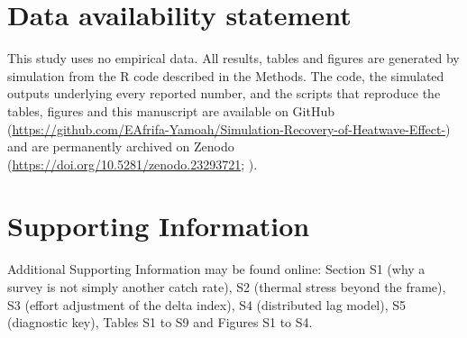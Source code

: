 \documentclass[11pt,a4paper]{article}
\begin{document}
\section*{Data availability statement}
This study uses no empirical data. All results, tables and figures are generated by simulation from the R code described in the Methods. The code, the simulated outputs underlying every reported number, and the scripts that reproduce the tables, figures and this manuscript are available on GitHub (\url{https://github.com/EAfrifa-Yamoah/Simulation-Recovery-of-Heatwave-Effect-}) and are permanently archived on Zenodo (\url{https://doi.org/10.5281/zenodo.23293721}; \citealp{awuah2026}).

\section*{Supporting Information}
Additional Supporting Information may be found online: Section S1 (why a survey is not simply another catch rate), S2 (thermal stress beyond the frame), S3 (effort adjustment of the delta index), S4 (distributed lag model), S5 (diagnostic key), Tables S1 to S9 and Figures S1 to S4.
\end{document}

